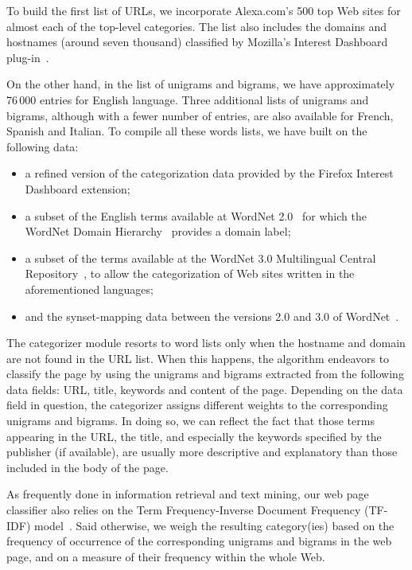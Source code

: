 \documentclass[conference]{IEEEtran}
\begin{document}
To build the first list of URLs, we incorporate Alexa.com's 500 top Web sites for almost each of the top-level categories.
The list also includes the domains and hostnames (around seven thousand) classified by Mozilla's Interest Dashboard plug-in~\cite{FID14plugin}.


On the other hand, in the list of unigrams and bigrams, we have approximately 76\,000 entries for English language. 
Three additional lists of unigrams and bigrams, although with a fewer number of entries, are also available for French, Spanish and Italian.
To compile all these words lists, we have built on the following data:

\begin{itemize}
  \item a refined version of the categorization data provided by the Firefox Interest Dashboard extension;
  \item a subset of the English terms available at WordNet 2.0~\cite{Miller95ACMCOM} for which the WordNet Domain Hierarchy~\cite{Magnini00LRE,Bentivogli04MLR} provides a domain label;
  \item a subset of the terms available at the WordNet 3.0 Multilingual Central Repository~\cite{Gonzalez12GW}, to allow the categorization of Web sites written in the aforementioned languages;
  \item and the synset-mapping data between the versions 2.0 and 3.0 of WordNet~\cite{Daude03RANLP}.
\end{itemize}





The categorizer module resorts to word lists only when the hostname and domain are not found in the URL list.
When this happens, the algorithm endeavors to classify the page by using the unigrams and bigrams extracted from the following data fields: URL, title, keywords and content of the page. 
Depending on the data field in question, the categorizer assigns different weights to the corresponding unigrams and bigrams. 
In doing so, we can reflect the fact that those terms appearing in the URL, the title, and especially the keywords specified by the publisher (if available), are usually more descriptive and explanatory than those included in the body of the page.

As frequently done in information retrieval and text mining, our web page classifier also relies on the Term Frequency-Inverse Document Frequency (TF-IDF) model~\cite{Salton75COM}. 
Said otherwise, we weigh the resulting category(ies) based on the frequency of occurrence of the corresponding unigrams and bigrams in the web page, and on a measure of their frequency within the whole Web.
\end{document}
